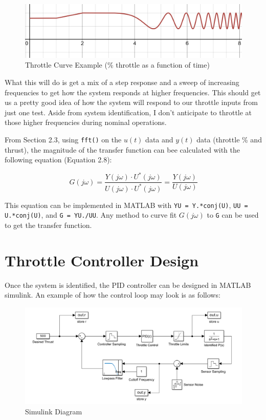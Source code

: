\documentclass{article}
\begin{document}
\begin{figure}[h]
    \centering
    \includegraphics[width=1\linewidth]{figures/throttle_curve.png}
    \caption{Throttle Curve Example (\% throttle as a function of time)}
    \label{fig:enter-label}
\end{figure}

What this will do is get a mix of a step response and a sweep of increasing frequencies to get how the system responds at higher frequencies. This should get us a pretty good idea of how the system will respond to our throttle inputs from just one test. Aside from system identification, I don't anticipate to throttle at those higher frequencies during nominal operations. 

From Section 2.3, using \texttt{fft()} on the $u(t)$ data and $y(t)$ data (throttle \% and thrust), the magnitude of the transfer function can bee calculated with the following equation (Equation 2.8):

\begin{equation*}
    G(j\omega)=\frac{Y(j\omega)\cdot U^*(j\omega)}{U(j\omega)\cdot U^*(j\omega)}=\frac{Y(j\omega)}{U(j\omega)}
\end{equation*}

This equation can be implemented in MATLAB with \texttt{YU = Y.*conj(U)}, \texttt{UU = U.*conj(U)}, and \texttt{G = YU./UU}. Any method to curve fit $G(j\omega)$ to \texttt{G} can be used to get the transfer function.

\section{Throttle Controller Design}

Once the system is identified, the PID controller can be designed in MATLAB simulink. An example of how the control loop may look is as follows:

\begin{figure}[h]
    \centering
    \includegraphics[width=1\linewidth]{figures/simulink_diagram.png}
    \caption{Simulink Diagram}
    \label{fig:enter-label}
\end{figure}
\end{document}
